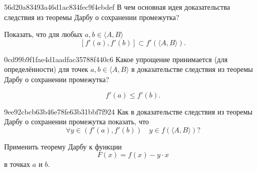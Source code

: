 \begin{note}{56d20a83493a46d1ac834fec9f4ebdef}
    В чем основная идея доказательства следствия из теоремы Дарбу о сохранении промежутка?

    \begin{cloze}{1}
        Показать, что для любых \( a, b \in \langle A, B \rangle  \)
        \[
            [f'(a), f'(b)] \subset f'(\langle A, B \rangle ).
        \]
    \end{cloze}
\end{note}

\begin{note}{0cd99b9f1fae4d1aadfac35788f440c6}
    Какое упрощение принимается (для определённости) для точек \( a, b \in \langle A, B \rangle  \) в доказательстве следствия из теоремы Дарбу о сохранении промежутка?

    \begin{cloze}{1}
        \[
            f'(a) \leqslant f'(b).
        \]
    \end{cloze}
\end{note}

\begin{note}{9ee92cbcb63b46e78fe63b31bbf7f924}
    Как в доказательстве следствия из теоремы Дарбу о сохранении промежутка показать, что
    \[
        \forall y \in (f'(a), f'(b)) \quad y \in f(\langle A, B \rangle )?
    \]

    \begin{cloze}{1}
        Применить теорему Дарбу к функции
        \[
            F(x) = f(x) - y \cdot x
        \]
        в точках \( a \) и \( b \).
    \end{cloze}
\end{note}


